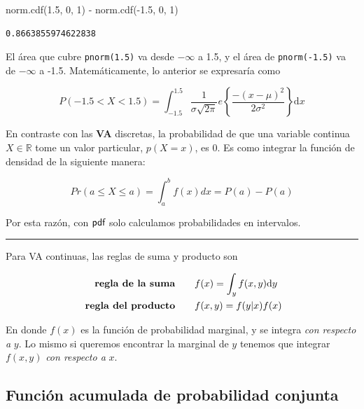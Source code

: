 \documentclass[
  letterpaper,
  DIV=11,
  numbers=noendperiod]{scrartcl}
\newenvironment{Shaded}{\begin{snugshade}}{\end{snugshade}}
\newcommand{\DecValTok}[1]{\textcolor[rgb]{0.68,0.00,0.00}{#1}}
\newcommand{\FloatTok}[1]{\textcolor[rgb]{0.68,0.00,0.00}{#1}}
\newcommand{\NormalTok}[1]{\textcolor[rgb]{0.00,0.23,0.31}{#1}}
\newcommand{\OperatorTok}[1]{\textcolor[rgb]{0.37,0.37,0.37}{#1}}
\begin{document}
\begin{Shaded}
\begin{Highlighting}[]
\NormalTok{norm.cdf(}\FloatTok{1.5}\NormalTok{, }\DecValTok{0}\NormalTok{, }\DecValTok{1}\NormalTok{) }\OperatorTok{{-}}\NormalTok{ norm.cdf(}\OperatorTok{{-}}\FloatTok{1.5}\NormalTok{, }\DecValTok{0}\NormalTok{, }\DecValTok{1}\NormalTok{)}
\end{Highlighting}
\end{Shaded}

\begin{verbatim}
0.8663855974622838
\end{verbatim}

El área que cubre \texttt{pnorm(1.5)} va desde \(-\infty\) a 1.5, y el
área de \texttt{pnorm(-1.5)} va de \(-\infty\) a -1.5. Matemáticamente,
lo anterior se expresaría como

\[
  P(-1.5 < X < 1.5) = \int_{-1.5}^{1.5}\frac{1}{\sigma \sqrt{2\pi}} e\left\{\frac{-(x-\mu)^2}{2\sigma^2}\right\}\text{d}x
\]

En contraste con las \textbf{VA} discretas, la probabilidad de que una
variable continua \(X\in \mathbb{R}\) tome un valor particular,
\(p(X = x)\), es 0. Es como integrar la función de densidad de la
siguiente manera:

\[
  Pr(a \leq X \leq a) = \int_a^b f(x)dx = P(a) - P(a)
\]

Por esta razón, con \(\text{\sf pdf}\) solo calculamos probabilidades en
intervalos.

\begin{center}\rule{0.5\linewidth}{0.5pt}\end{center}

Para VA continuas, las reglas de suma y producto son

\begin{align*}
\text{ \bf{regla de la suma}} \quad\quad &f(x) = \int_y f(x,y)\text{d}y \\
\text{ \bf{regla del producto}}\quad\quad &f(x, y) = f(y|x)f(x)
\end{align*}

En donde \(f(x)\) es la función de probabilidad marginal, y se integra
\emph{con respecto a} \(y\). Lo mismo si queremos encontrar la marginal
de \(y\) tenemos que integrar \(f(x,y)\) \emph{con respecto a} \(x\).

\hypertarget{funciuxf3n-acumulada-de-probabilidad-conjunta}{%
\subsection{Función acumulada de probabilidad
conjunta}\label{funciuxf3n-acumulada-de-probabilidad-conjunta}}
\end{document}
